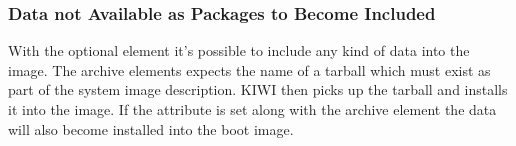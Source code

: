 \subsubsection{Data not Available as Packages to Become Included}
With the optional  element it's possible to include
any kind of data into the image. The archive elements expects the
name of a tarball which must exist as part of the system image
description. KIWI then picks up the tarball and installs it into
the image. If the  attribute is set along with
the archive element the data will also become installed into the
boot image.



